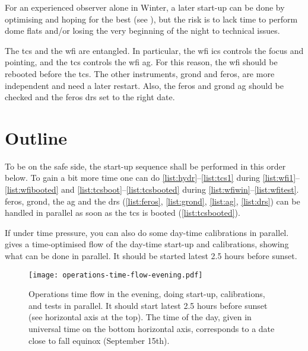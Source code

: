 \documentclass[11pt,fleqn,a4paper]{book}
\begin{document}
For an experienced observer alone in Winter, a later start-up can be done by optimising and hoping for the best (see ), but the risk is to lack time to perform \gls{dome flats} and/or losing the very beginning of the night to technical issues.

The \gls{tcs} and the \gls{wfi} are entangled.  In particular, the \gls{wfi} \gls{ics} controls the \gls{focus} and \gls{pointing}, and the \gls{tcs} controls the \gls{wfi} \gls{ag}.  For this reason, the \gls{wfi} should be rebooted before the \gls{tcs}.  The other instruments, \gls{grond} and \gls{feros}, are more independent and need a later restart. Also, the \gls{feros} and \gls{grond} \gls{ag} should be checked and the \gls{feros} \gls{drs} set to the right date.

\section{Outline}
\label{sec:startupoutline}

To be on the safe side, the start-up sequence shall be performed in this order below. To gain a bit more time one can do \ref{list:hydr}--\ref{list:tcs1} during \ref{list:wfi1}--\ref{list:wfibooted} and
\ref{list:tcsboot}--\ref{list:tcsbooted} during
\ref{list:wfiwin}--\ref{list:wfitest}.  \gls{feros}, \gls{grond}, the \acrlong{ag} and the \acrlong{drs} (\ref{list:feros}, \ref{list:grond}, \ref{list:ag}, \ref{list:drs}) can be handled in parallel as soon as the \gls{tcs} is booted
(\ref{list:tcsbooted}).  

If under time pressure, you can also do some day-time calibrations in parallel.  gives a time-optimised flow of the day-time start-up and calibrations, showing what can be done in parallel.  It should be started latest 2.5 hours before sunset.
\begin{figure}
\texttt{[image: operations-time-flow-evening.pdf]}
\caption[Time-flow of afternoon operations]{Operations time flow in the evening, doing start-up, calibrations, and tests in parallel.  It should start latest 2.5 hours before sunset (see horizontal axis at the top).  The time of the day, given in universal time on the bottom horizontal axis, corresponds to a date close to fall equinox (September 15th).}
\label{fig:timeflow-eve}
\end{figure}
\end{document}
